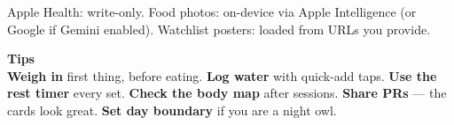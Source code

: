 \documentclass[10pt,a4paper,twocolumn]{article}
\begin{document}
Apple Health: write-only. Food photos: on-device via Apple Intelligence (or Google if Gemini enabled). Watchlist posters: loaded from URLs you provide.

\vspace{6pt}
\begin{tipbox}
{\normalsize\bfseries Tips}\\[3pt]
\textbf{Weigh in} first thing, before eating. \textbf{Log water} with quick-add taps. \textbf{Use the rest timer} every set. \textbf{Check the body map} after sessions. \textbf{Share PRs} — the cards look great. \textbf{Set day boundary} if you are a night owl.
\end{tipbox}
\end{document}
